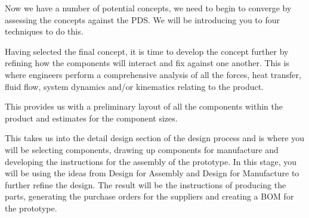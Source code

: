 Now we have a number of potential concepts, we need to begin to converge by assessing the concepts against the \ac{PDS}. We will be introducing you to four techniques to do this.

 Having selected the final concept, it is time to develop the concept further by refining how the components will interact and fix against one another. This is where engineers perform a comprehensive analysis of all the forces, heat transfer, fluid flow, system dynamics and/or kinematics relating to the product.

This provides us with a preliminary layout of all the components within the product and estimates for the component sizes.

This takes us into the detail design section of the design process and is where you will be selecting components, drawing up components for manufacture and developing the instructions for the assembly of the prototype. In this stage, you will be using the ideas from Design for Assembly and Design for Manufacture to further refine the design. The result will be the instructions of producing the parts, generating the purchase orders for the suppliers and creating a \acf{BOM} for the prototype.
